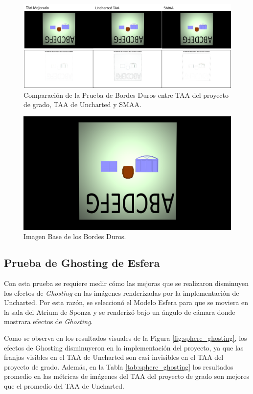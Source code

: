 \documentclass[pregrado]{tesis-usb} %
\begin{document}
\begin{figure}[!htb]
	\centering
	\includegraphics[scale=0.4]{images/results/hard_test.png}
	\caption{Comparación de la Prueba de Bordes Duros entre TAA del proyecto de grado, TAA de Uncharted y SMAA.}\label{fig:hard_test_render}
\end{figure}

\begin{figure}[!htb]
	\centering
	\includegraphics[scale=0.09]{images/results/hard_test_sobel_ground_truth.png}
	\caption{Imagen Base de los Bordes Duros.}\label{fig:hard_test_truth}
\end{figure}

\FloatBarrier

\subsection{Prueba de Ghosting de Esfera}
Con esta prueba se requiere medir cómo las mejoras que se realizaron disminuyen los efectos de \textit{Ghosting} en las imágenes renderizadas por la implementación de Uncharted. Por esta razón, se seleccionó el Modelo Esfera para que se moviera en la sala del Atrium de Sponza y se renderizó bajo un ángulo de cámara donde mostrara efectos de \textit{Ghosting}.

Como se observa en los resultados visuales de la Figura \ref{fig:sphere_ghosting}, los efectos de  Ghosting disminuyeron en la implementación del proyecto, ya que las franjas visibles en el TAA de Uncharted son casi invisibles en el TAA del proyecto de grado. Además, en la Tabla \ref{tab:sphere_ghosting} los resultados promedio en las métricas de imágenes del TAA del proyecto de grado son mejores que el promedio del TAA de Uncharted.
\end{document}
